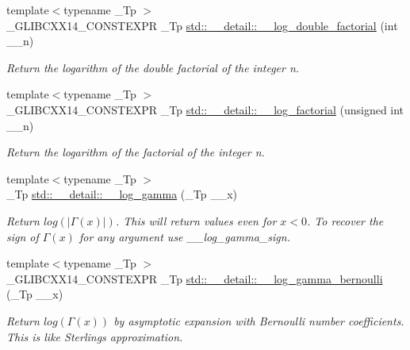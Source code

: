 \begin{DoxyCompactItemize}
{\footnotesize template$<$typename \+\_\+\+Tp $>$ }\\\+\_\+\+G\+L\+I\+B\+C\+X\+X14\+\_\+\+C\+O\+N\+S\+T\+E\+X\+P\+R \+\_\+\+Tp \hyperlink{namespacestd_1_1____detail_aa832ed1d29fd41c40cf892cc1feef7e9}{std\+::\+\_\+\+\_\+detail\+::\+\_\+\+\_\+log\+\_\+double\+\_\+factorial} (int \+\_\+\+\_\+n)
\begin{DoxyCompactList}\small\item\em Return the logarithm of the double factorial of the integer n. \end{DoxyCompactList}\item 
{\footnotesize template$<$typename \+\_\+\+Tp $>$ }\\\+\_\+\+G\+L\+I\+B\+C\+X\+X14\+\_\+\+C\+O\+N\+S\+T\+E\+X\+P\+R \+\_\+\+Tp \hyperlink{namespacestd_1_1____detail_a2809419dbbe9fc60066dacfdc13761d4}{std\+::\+\_\+\+\_\+detail\+::\+\_\+\+\_\+log\+\_\+factorial} (unsigned int \+\_\+\+\_\+n)
\begin{DoxyCompactList}\small\item\em Return the logarithm of the factorial of the integer n. \end{DoxyCompactList}\item 
{\footnotesize template$<$typename \+\_\+\+Tp $>$ }\\\+\_\+\+Tp \hyperlink{namespacestd_1_1____detail_aa8be6df2c5d12d0d1cb1f02a6b3592ef}{std\+::\+\_\+\+\_\+detail\+::\+\_\+\+\_\+log\+\_\+gamma} (\+\_\+\+Tp \+\_\+\+\_\+x)
\begin{DoxyCompactList}\small\item\em Return $ log(|\Gamma(x)|) $. This will return values even for $ x < 0 $. To recover the sign of $ \Gamma(x) $ for any argument use {\itshape \+\_\+\+\_\+log\+\_\+gamma\+\_\+sign}. \end{DoxyCompactList}\item 
{\footnotesize template$<$typename \+\_\+\+Tp $>$ }\\\+\_\+\+G\+L\+I\+B\+C\+X\+X14\+\_\+\+C\+O\+N\+S\+T\+E\+X\+P\+R \+\_\+\+Tp \hyperlink{namespacestd_1_1____detail_ac13e31ebcd3c99d6a7cad9010e039315}{std\+::\+\_\+\+\_\+detail\+::\+\_\+\+\_\+log\+\_\+gamma\+\_\+bernoulli} (\+\_\+\+Tp \+\_\+\+\_\+x)
\begin{DoxyCompactList}\small\item\em Return $log(\Gamma(x))$ by asymptotic expansion with Bernoulli number coefficients. This is like Sterling\textquotesingle{}s approximation. \end{DoxyCompactList}\item 

\end{DoxyCompactItemize}
